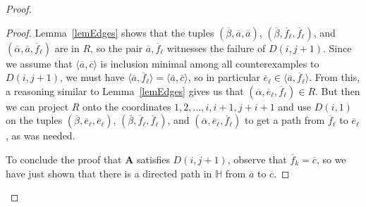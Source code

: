 \documentclass{amsart}
\theoremstyle{plain}
\theoremstyle{definition}
\begin{document}
\begin{proof}
\begin{proof}
  Lemma~\ref{lemEdges} shows that the tuples $({\overline{\beta}},{\overline{a}},{\overline{a}})$,
  $({\overline{\beta}}, {\overline{f}}_\ell,{\overline{f}}_\ell)$, and   $({\overline{\alpha}},{\overline{a}},{\overline{f}}_\ell)$ are in $R$, so the
  pair ${\overline{a}},{\overline{f}}_\ell$ witnesses the failure of $D(i,j+1)$.
  Since we assume that $\langle {\overline{a}},{\overline{c}}\rangle$ is inclusion minimal
  among all counterexamples to $D(i,j+1)$, we must have $\langle {\overline{a}},{\overline{f}}_\ell\rangle =\langle {\overline{a}},{\overline{c}}\rangle$, so in particular ${\overline{e}}_\ell\in
  \langle {\overline{a}},{\overline{f}}_\ell\rangle$. From this, a reasoning similar to
  Lemma~\ref{lemEdges} gives us that $({\overline{\alpha}},{\overline{e}}_\ell,{\overline{f}}_\ell)\in R$. But then we can project $R$ onto the coordinates
  $1,2,\dots,i,i+1,j+i+1$ and use $D(i,1)$ on the tuples 
  $({\overline{\beta}}, {\overline{e}}_\ell,{\overline{e}}_\ell)$, $({\overline{\beta}},{\overline{f}}_\ell,{\overline{f}}_\ell)$, and $({\overline{\alpha}},{\overline{e}}_\ell,{\overline{f}}_\ell)$
  to get a path from ${\overline{f}}_\ell$ to
  ${\overline{e}}_\ell$, as was needed.

  To conclude the proof that ${{\mathbf{A}}}$ satisfies $D(i,j+1)$, observe that ${\overline{f}}_k={\overline{c}}$, so we have just
  shown that there is a directed path in ${\mathbb{H}}$ from ${\overline{a}}$ to ${\overline{c}}$.
\end{proof}

\begin{figure}
  \begin{center}
\end{center}
\end{figure}
\end{proof}
\end{document}
